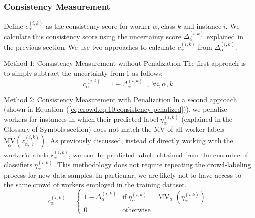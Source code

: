 
\subsubsection{Consistency Measurement}
Define $c_{\alpha}^{(i,k)} $ as the consistency score for worker $\alpha $, class $k $ and instance $i $. We calculate this consistency score using the uncertainty score $\Delta_{\alpha}^{(i,k)} $ explained in the previous section. We use two approaches to calculate $c_{\alpha}^{(i,k)} $ from $\Delta_{\alpha}^{(i,k)} $.

\begin{mymdframed}{Method 1: Consistency Measurement without Penalization}
    The first approach is to simply subtract the uncertainty from $1 $ as follows:
    \begin{equation}
        c_{\alpha}^{(i,k)}=1-\Delta_{\alpha}^{(i,k)}\;\;,\;\forall i,\alpha,k
        \label{eq:crowd.Eq.9.consistency}%
    \end{equation}
\end{mymdframed}

\begin{mymdframed}{Method 2: Consistency Measurement with Penalization}
    In a second approach (shown in Equation~(\ref{eq:crowd.eq.10.consistency-penalized})), we penalize workers for instances in which their predicted label $\eta_{\alpha}^{(i,k)} $ (explained in the Glossary of Symbols section) does not match the MV of all worker labels ${{\underset \alpha{\mathrm{MV}}}{\left(z_{\alpha,\;k}^{(i,k)}\right)}} $. As previously discussed, instead of directly working with the worker's labels $z_{\alpha}^{(i,k)} $, we use the predicted labels obtained from the ensemble of classifiers $\eta_{\alpha}^{(i,k)} $. This methodology does not require repeating the crowd-labeling process for new data samples. In particular, we are likely not to have access to the same crowd of workers employed in the training dataset.
    \begin{equation}
        c_{\alpha}^{(i,k)} =
        \begin{cases}
            1 - \Delta_{\alpha}^{(i,k)} & \text{if } \eta_{\alpha}^{(i,k)} = \operatorname{MV}_{\alpha}(\eta_{\alpha}^{(i,k)}) \\
            0 & \text{otherwise}
        \end{cases}
        \label{eq:crowd.eq.10.consistency-penalized}
    \end{equation}
\end{mymdframed}

